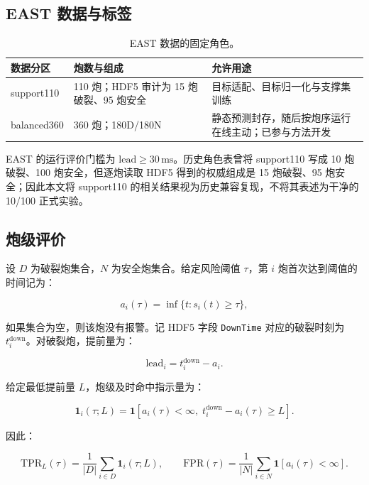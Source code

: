 \documentclass[11pt,a4paper]{article}
\newcommand{\code}[1]{\texttt{\small #1}}
\begin{document}
\subsection{EAST 数据与标签}

\begin{table}[H]
\centering
\caption{EAST 数据的固定角色。}
\begin{tabularx}{\textwidth}{l C{28mm} Y}
\toprule
数据分区 & 炮数与组成 & 允许用途\\
\midrule
support110 & 110 炮；HDF5 审计为 15 炮破裂、95 炮安全 & 目标适配、目标归一化与支撑集训练\\
balanced360 & 360 炮；180D/180N & 静态预测封存，随后按炮序运行在线主动；已参与方法开发\\
\bottomrule
\end{tabularx}
\end{table}

EAST 的运行评价门槛为 \(\mathrm{lead}\geq30\,\mathrm{ms}\)。历史角色表曾将 support110 写成 10 炮破裂、100 炮安全，但逐炮读取 HDF5 得到的权威组成是 15 炮破裂、95 炮安全；因此本文将 support110 的相关结果视为历史兼容复现，不将其表述为干净的 10/100 正式实验。

\subsection{炮级评价}

设 \(D\) 为破裂炮集合，\(N\) 为安全炮集合。给定风险阈值 \(\tau\)，第 \(i\) 炮首次达到阈值的时间记为：

\begin{equation}
a_i(\tau)=\inf\{t:s_i(t)\geq\tau\},
\label{eq:first-alarm}
\end{equation}

如果集合为空，则该炮没有报警。记 HDF5 字段 \code{DownTime} 对应的破裂时刻为 \(t_i^{\mathrm{down}}\)。对破裂炮，提前量为：

\begin{equation}
\mathrm{lead}_i=t_i^{\mathrm{down}}-a_i.
\label{eq:lead}
\end{equation}

给定最低提前量 \(L\)，炮级及时命中指示量为：

\begin{equation}
\mathbf{1}_{i}(\tau;L)=
\mathbf{1}\!\left[a_i(\tau)<\infty,\;
t_i^{\mathrm{down}}-a_i(\tau)\geq L\right].
\label{eq:timely}
\end{equation}

因此：

\begin{equation}
\mathrm{TPR}_{L}(\tau)=
\frac{1}{|D|}\sum_{i\in D}\mathbf{1}_{i}(\tau;L),
\qquad
\mathrm{FPR}(\tau)=
\frac{1}{|N|}\sum_{i\in N}
\mathbf{1}\!\left[a_i(\tau)<\infty\right].
\label{eq:tpr-fpr}
\end{equation}
\end{document}
